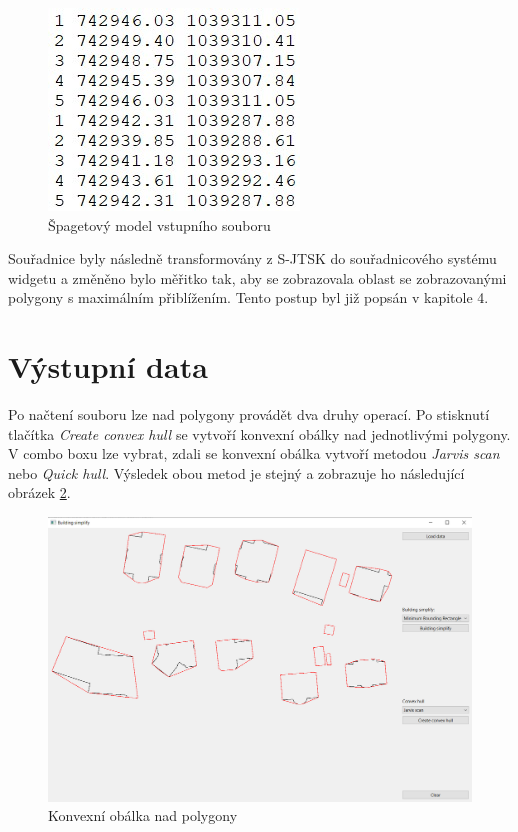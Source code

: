 \documentclass[11pt]{article}
\begin{document}
		\begin{figure}[htbh]
			\centering
			\includegraphics[scale=1]{images/vstup_data_U2.jpg} 
			\caption{Špagetový model vstupního souboru}
			\label{fig:vstup.}
		\end{figure} 
		
		Souřadnice byly následně transformovány z S-JTSK do souřadnicového systému widgetu a změněno bylo měřitko tak, aby se zobrazovala oblast se  zobrazovanými polygony s maximálním přiblížením. Tento postup byl již popsán v kapitole 4.
		
		\clearpage

		
		
		\section{Výstupní data}
		
		Po načtení souboru lze nad polygony provádět dva druhy operací. Po stisknutí tlačítka \textit{Create convex hull} se vytvoří konvexní obálky nad jednotlivými polygony. V combo boxu lze vybrat, zdali se konvexní obálka vytvoří metodou \textit{Jarvis scan} nebo \textit{Quick hull}. Výsledek obou metod je stejný a zobrazuje ho následující obrázek \ref{fig:app_convexHull}.
		
		\begin{figure}[htbh]
			\centering
			\includegraphics[scale=0.4]{images/U2_aplikace_ConvexHull.png} 
			\caption{Konvexní obálka nad polygony}
			\label{fig:app_convexHull}
		\end{figure} 
		
\end{document}
